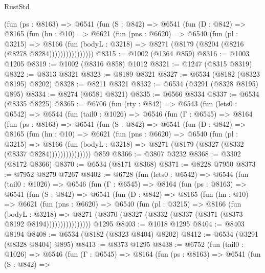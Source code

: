 \begin{lexlean}{RustStd}
\begin{coremodule}
              (fun (ps : @8163) =>
              @6541
                (fun (S : @842) =>
                @6541
                  (fun (D : @842) =>
                  @8165
                    (fun (hn : @10) =>
                    @6621
                      (fun (pns : @6620) =>
                      @6540
                        (fun (pl : @3215) =>
                        @8166
                          (fun (bodyL : @3218) =>
                          @8271 (@8179 (@8204 (@8216 (@8278 @8284))))))))))))))))
@8315 := @1002 (@1364 @859)
@8316 := @1003 @1205
@8319 := @1002 (@8316 @858) @1012
@8321 := @1247 (@8315 @8319)
@8322 := @8313 @8321
@8323 := @8189 @8321
@8327 := @6534 (@8182 (@8323 @8195) @8202)
@8328 := @8211 @8321
@8332 := @6534 (@3291 (@8328 @8195) @895)
@8334 := @8274 (@6581 @8321)
@8335 := @6566 @8334
@8337 := @6534 (@8335 @8225)
@8365 := @6706
    (fun (rty : @842) =>
    @6543
      (fun (lets0 : @6542) =>
      @6544
        (fun (tail0 : @1026) =>
        @6546
          (fun (Γ : @6545) =>
          @8164
            (fun (ps : @8163) =>
            @6541
              (fun (S : @842) =>
              @6541
                (fun (D : @842) =>
                @8165
                  (fun (hn : @10) =>
                  @6621
                    (fun (pns : @6620) =>
                    @6540
                      (fun (pl : @3215) =>
                      @8166
                        (fun (bodyL : @3218) =>
                        @8271 (@8179 (@8327 (@8332 (@8337 @8284)))))))))))))))
    @859
@8366 := @3807 @3232
@8368 := @3302 (@8172 @8366)
@8370 := @6534 (@8171 @8368)
@8371 := @8228 @7950
@8373 := @7952 @8279 @7267
@8402 := @6728
    (fun (lets0 : @6542) =>
    @6544
      (fun (tail0 : @1026) =>
      @6546
        (fun (Γ : @6545) =>
        @8164
          (fun (ps : @8163) =>
          @6541
            (fun (S : @842) =>
            @6541
              (fun (D : @842) =>
              @8165
                (fun (hn : @10) =>
                @6621
                  (fun (pns : @6620) =>
                  @6540
                    (fun (pl : @3215) =>
                    @8166
                      (fun (bodyL : @3218) =>
                      @8271 (@8370 (@8327 (@8332 (@8337 (@8371 (@8373 @8192 @8194))))))))))))))))
    @1295
@8403 := @1018 @1295
@8404 := @8403 @8194
@8408 := @6534 (@8182 (@8323 @8404) @8202)
@8412 := @6534 (@3291 (@8328 @8404) @895)
@8413 := @8373 @1295
@8438 := @6752
    (fun (tail0 : @1026) =>
    @6546
      (fun (Γ : @6545) =>
      @8164
        (fun (ps : @8163) =>
        @6541
          (fun (S : @842) =>

\end{coremodule}
\end{lexlean}
